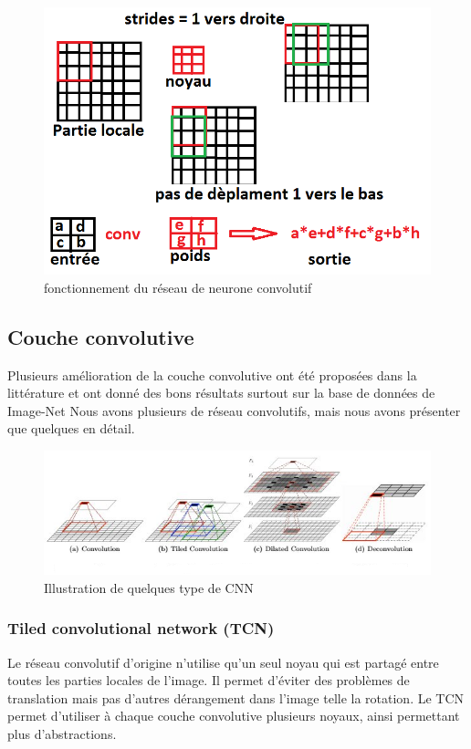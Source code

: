 \begin{figure}[H]
    \centering
    \includegraphics[scale = 0.7]{images/operations_conv.png}
    \caption{fonctionnement du réseau de neurone convolutif}
\end{figure}

\subsection{Couche convolutive}
Plusieurs amélioration de la couche convolutive ont été proposées dans la littérature et ont donné des bons résultats surtout sur la base de données de Image-Net \cite{im1}%
Nous avons plusieurs de réseau convolutifs, mais nous avons présenter que quelques en détail.
\begin{figure}[H]
    \centering
    \includegraphics[scale = 0.8]{images/all_cnn.png}
    \caption{Illustration de quelques type de CNN}
\end{figure}
\subsubsection{Tiled convolutional network (TCN)}
Le réseau convolutif d'origine n'utilise qu'un seul noyau qui est partagé entre toutes les parties locales de l'image. Il permet d'éviter des problèmes de translation mais pas d'autres dérangement dans l'image telle la rotation. Le TCN permet d'utiliser à chaque couche convolutive plusieurs noyaux, ainsi permettant plus d'abstractions\cite{tcnn1, tcnn2, tcnn3}. 



